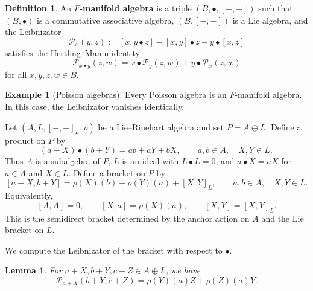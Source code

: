 \documentclass[12pt,reqno]{amsart}
\newtheorem{lemma}[theorem]{Lemma}
\theoremstyle{definition}
\newtheorem{definition}[theorem]{Definition}
\newtheorem{example}[theorem]{Example}
\theoremstyle{remark}
\newcommand{\Pcal}{\mathcal P}
\begin{document}
	
	
	\begin{definition}
		An \textbf{$F$-manifold algebra} \cite{Dot,HertlingManin,LiuShengBai2020} is a
		triple $(B,\bullet,[-,-])$ such that
		$(B,\bullet)$ is a commutative associative algebra, $(B,[-,-])$ is a Lie
		algebra, and the Leibnizator
		\begin{equation}\label{eq:Leibnizator-def}
			\Pcal_x(y,z):=[x,y\bullet z]-[x,y]\bullet z-y\bullet[x,z]
		\end{equation}
		satisfies the Hertling--Manin identity
		\begin{equation}\label{eq:HM}
			\Pcal_{x\bullet y}(z,w)=x\bullet\Pcal_y(z,w)+y\bullet\Pcal_x(z,w)
		\end{equation}
		for all $x,y,z,w\in B$.
	\end{definition}
	
	
	
	
	
	
	\begin{example}[Poisson algebras]
		Every Poisson algebra is an $F$-manifold algebra.  In this case, the
		Leibnizator vanishes identically.
	\end{example}
	
	
	
	
	
	
	Let $(A,L,[-,-]_L,\rho)$ be a Lie--Rinehart algebra and set $P=A\oplus L$.
	Define a product on $P$ by
	\begin{equation}\label{eq:F-product}
		(a+X)\bullet(b+Y)=ab+aY+bX,
		\qquad a,b\in A,\quad X,Y\in L,
	\end{equation}
	Thus $A$ is a subalgebra of $P$, $L$ is an ideal with
	$L\bullet L=0$, and $a\bullet X=aX$ for $a\in A$ and $X\in L$.
	Define a bracket on $P$ by
	\begin{equation}\label{eq:F-bracket}
		[a+X,b+Y]
		=\rho(X)(b)-\rho(Y)(a)+[X,Y]_L,
		\qquad a,b\in A,\quad X,Y\in L.
	\end{equation}
	Equivalently,
	\[
	[A,A]=0,
	\qquad
	[X,a]=\rho(X)(a),
	\qquad
	[X,Y]=[X,Y]_L.
	\]
	This is the semidirect bracket determined by the anchor action on \(A\) and
	the Lie bracket on \(L\).
	
	
	
	We compute the Leibnizator of the bracket with respect to $\bullet$.
	
	\begin{lemma}\label{lem:Leibnizator-formula}
		For $a+X, b+Y, c+Z\in A\oplus L$, we have
		\begin{equation}\label{eq:Leibnizator-formula}
			\Pcal_{a+X}(b+Y,c+Z)=\rho(Y)(a)Z+\rho(Z)(a)Y.
		\end{equation}
		
	\end{lemma}
	
\end{document}
